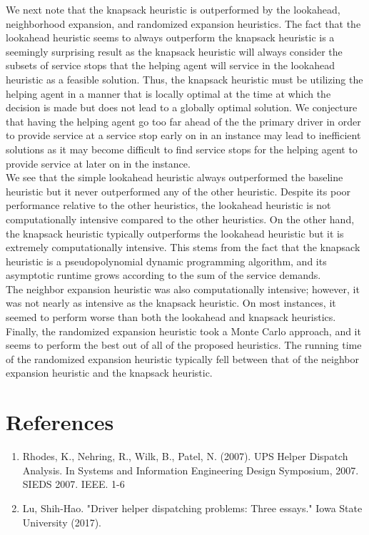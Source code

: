 \documentclass[12pt]{scrartcl}
\begin{document}
We next note that the knapsack heuristic is outperformed by the lookahead, neighborhood expansion, and randomized expansion heuristics. The fact that the lookahead heuristic seems to always outperform the knapsack heuristic is a seemingly surprising result as the knapsack heuristic will always consider the subsets of service stops that the helping agent will service in the lookahead heuristic as a feasible solution. Thus, the knapsack heuristic must be utilizing the helping agent in a manner that is locally optimal at the time at which the decision is made but does not lead to a globally optimal solution. We conjecture that having the helping agent go too far ahead of the the primary driver in order to provide service at a service stop early on in an instance may lead to inefficient solutions as it may become difficult to find service stops for the helping agent to provide service at later on in the instance. \\

We see that the simple lookahead heuristic always outperformed the baseline heuristic but it never outperformed any of the other heuristic. Despite its poor performance relative to the other heuristics, the lookahead heuristic is not computationally intensive compared to the other heuristics. On the other hand, the knapsack heuristic typically outperforms the lookahead heuristic but it is extremely computationally intensive. This stems from the fact that the knapsack heuristic is a pseudopolynomial dynamic programming algorithm, and its asymptotic runtime grows according to the sum of the service demands. \\

The neighbor expansion heuristic was also computationally intensive; however, it was not nearly as intensive as the knapsack heuristic. On most instances, it seemed to perform worse than both the lookahead and knapsack heuristics. Finally, the randomized expansion heuristic took a Monte Carlo approach, and it seems to perform the best out of all of the proposed heuristics. The running time of the randomized expansion heuristic typically fell between that of the neighbor expansion heuristic and the knapsack heuristic. \\





\appendix

\newpage

\section*{References}

\begin{enumerate}
    \item Rhodes, K., Nehring, R., Wilk, B., Patel, N. (2007). UPS Helper Dispatch Analysis. In Systems and Information Engineering Design Symposium, 2007. SIEDS 2007. IEEE. 1-6
    \item Lu, Shih-Hao. "Driver helper dispatching problems: Three essays." Iowa State University (2017).
\end{enumerate}
\end{document}
